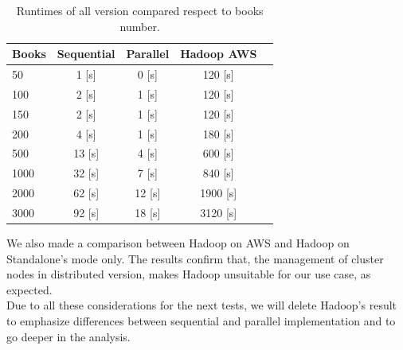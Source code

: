 \documentclass[10pt,twocolumn,letterpaper]{article}
\begin{document}
\begin{table}[H]
\begin{center}
\begin{tabular}{|l|c|c|c|c|}
\hline
Books & Sequential & Parallel & Hadoop AWS\\
\hline\hline
50 & 1 [s] & 0 [s] & 120 [s]\\
100 & 2 [s] & 1 [s] & 120 [s]\\
150 & 2 [s] & 1 [s] & 120 [s]\\
200 & 4 [s] & 1 [s] & 180 [s]\\
500 & 13 [s] & 4 [s] & 600 [s]\\
1000 & 32 [s] & 7 [s] & 840 [s]\\
2000 & 62 [s] & 12 [s] & 1900 [s]\\
3000 & 92 [s] & 18 [s] & 3120 [s]\\
\hline
\end{tabular}
\end{center}
\caption{Runtimes of all version compared respect to books number.}
\end{table}

We also made a comparison between Hadoop on AWS and Hadoop on Standalone's mode only. The results confirm that, the management of  cluster nodes in distributed version, makes Hadoop  unsuitable for our use case, as expected.\\
Due to all these considerations for the next tests, we will delete Hadoop's result to emphasize differences between sequential and parallel implementation and to go deeper in the analysis.
\end{document}
